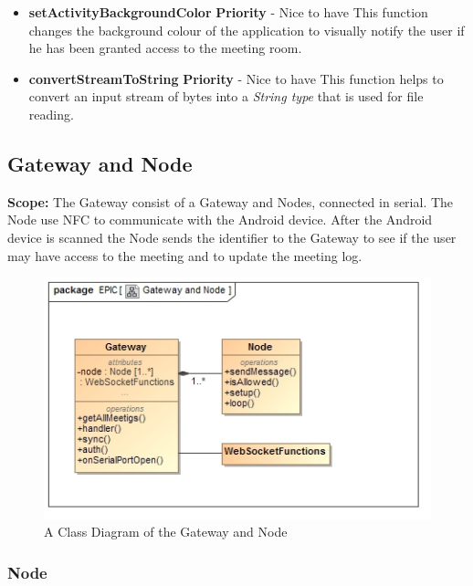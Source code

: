 \documentclass{article}
\begin{document}
\begin{itemize}
			\item \textbf{setActivityBackgroundColor}
				\newline\textbf{ Priority } - Nice to have
				\newline This function changes the background colour of the application to visually notify the user if he has been granted access to the meeting room.

			\item \textbf{convertStreamToString}
				\newline\textbf{ Priority } - Nice to have
				\newline This function helps to convert an input stream of bytes into a \textit{String type} that is used for file reading.


		\end{itemize}

\newpage		
		\subsection{Gateway and Node}
\textbf{Scope: }The Gateway consist of a Gateway and Nodes, connected in serial. The Node use NFC to communicate with the Android device. After the Android device is scanned the Node sends the identifier to the Gateway to see if the user may have access to the meeting and to update the meeting log. 
\begin{figure}[H]
 			 \centering
			  \includegraphics[width=12cm]{GatewayAndNodeClass}
		 	 \caption{A Class Diagram of the Gateway and Node}
		\end{figure}

		\subsubsection{Node}
\end{document}
